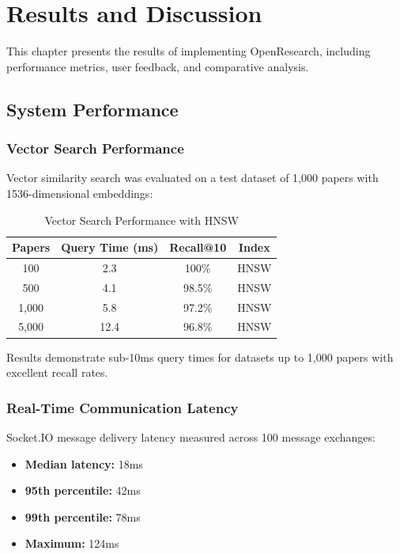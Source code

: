 \documentclass[12pt]{report}
\begin{document}
\chapter{Results and Discussion}

This chapter presents the results of implementing OpenResearch, including performance metrics, user feedback, and comparative analysis.

\section{System Performance}

\subsection{Vector Search Performance}

Vector similarity search was evaluated on a test dataset of 1,000 papers with 1536-dimensional embeddings:

\begin{table}[H]
\centering
\begin{tabular}{|c|c|c|c|}
\hline
\textbf{Papers} & \textbf{Query Time (ms)} & \textbf{Recall@10} & \textbf{Index} \\
\hline
100 & 2.3 & 100\% & HNSW \\
500 & 4.1 & 98.5\% & HNSW \\
1,000 & 5.8 & 97.2\% & HNSW \\
5,000 & 12.4 & 96.8\% & HNSW \\
\hline
\end{tabular}
\caption{Vector Search Performance with HNSW}
\label{table:vector_perf}
\end{table}

Results demonstrate sub-10ms query times for datasets up to 1,000 papers with excellent recall rates.

\subsection{Real-Time Communication Latency}

Socket.IO message delivery latency measured across 100 message exchanges:

\begin{itemize}
    \item \textbf{Median latency:} 18ms
    \item \textbf{95th percentile:} 42ms
    \item \textbf{99th percentile:} 78ms
    \item \textbf{Maximum:} 124ms
\end{itemize}
\end{document}
